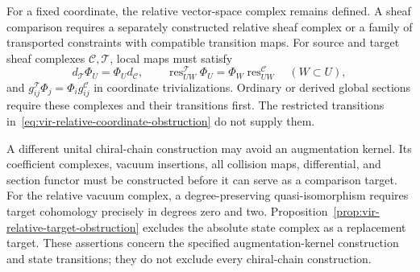 For a fixed coordinate, the relative vector-space complex remains defined.
A sheaf comparison requires a separately constructed relative sheaf complex or a family of transported constraints with compatible transition maps.
For source and target sheaf complexes $\mathcal C,\mathcal T$, local maps must satisfy
\[
 d_{\mathcal T}\Phi_U=\Phi_Ud_{\mathcal C},\qquad
 \operatorname{res}^{\mathcal T}_{UW}\Phi_U
 =\Phi_W\operatorname{res}^{\mathcal C}_{UW}\quad(W\subset U),
\]
and $g^{\mathcal T}_{ij}\Phi_j=\Phi_i g^{\mathcal C}_{ij}$ in coordinate trivializations.
Ordinary or derived global sections require these complexes and their transitions first.
The restricted transitions in~\eqref{eq:vir-relative-coordinate-obstruction} do not supply them.

A different unital chiral-chain construction may avoid an augmentation kernel.
Its coefficient complexes, vacuum insertions, all collision maps, differential, and section functor must be constructed before it can serve as a comparison target.
For the relative vacuum complex, a degree-preserving quasi-isomorphism requires target cohomology precisely in degrees zero and two.
Proposition~\ref{prop:vir-relative-target-obstruction} excludes the absolute state complex as a replacement target.
These assertions concern the specified augmentation-kernel construction and state transitions; they do not exclude every chiral-chain construction.

